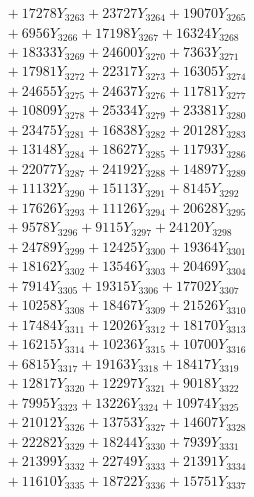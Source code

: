 \documentclass[a4paper,10pt]{article}
\begin{document}
{\begin{align}
&\;  + 17278 Y_{3263} + 23727 Y_{3264} + 19070 Y_{3265} \\[0.3ex]
&\;  + 6956 Y_{3266} + 17198 Y_{3267} + 16324 Y_{3268} \\[0.5ex]\allowbreak
&\;  + 18333 Y_{3269} + 24600 Y_{3270} + 7363 Y_{3271} \\[0.3ex]
&\;  + 17981 Y_{3272} + 22317 Y_{3273} + 16305 Y_{3274} \\[0.3ex]
&\;  + 24655 Y_{3275} + 24637 Y_{3276} + 11781 Y_{3277} \\[0.3ex]
&\;  + 10809 Y_{3278} + 25334 Y_{3279} + 23381 Y_{3280} \\[0.3ex]
&\;  + 23475 Y_{3281} + 16838 Y_{3282} + 20128 Y_{3283} \\[0.3ex]
&\;  + 13148 Y_{3284} + 18627 Y_{3285} + 11793 Y_{3286} \\[0.3ex]
&\;  + 22077 Y_{3287} + 24192 Y_{3288} + 14897 Y_{3289} \\[0.3ex]
&\;  + 11132 Y_{3290} + 15113 Y_{3291} + 8145 Y_{3292} \\[0.3ex]
&\;  + 17626 Y_{3293} + 11126 Y_{3294} + 20628 Y_{3295} \\[0.3ex]
&\;  + 9578 Y_{3296} + 9115 Y_{3297} + 24120 Y_{3298} \\[0.5ex]\allowbreak
&\;  + 24789 Y_{3299} + 12425 Y_{3300} + 19364 Y_{3301} \\[0.3ex]
&\;  + 18162 Y_{3302} + 13546 Y_{3303} + 20469 Y_{3304} \\[0.3ex]
&\;  + 7914 Y_{3305} + 19315 Y_{3306} + 17702 Y_{3307} \\[0.3ex]
&\;  + 10258 Y_{3308} + 18467 Y_{3309} + 21526 Y_{3310} \\[0.3ex]
&\;  + 17484 Y_{3311} + 12026 Y_{3312} + 18170 Y_{3313} \\[0.3ex]
&\;  + 16215 Y_{3314} + 10236 Y_{3315} + 10700 Y_{3316} \\[0.3ex]
&\;  + 6815 Y_{3317} + 19163 Y_{3318} + 18417 Y_{3319} \\[0.3ex]
&\;  + 12817 Y_{3320} + 12297 Y_{3321} + 9018 Y_{3322} \\[0.3ex]
&\;  + 7995 Y_{3323} + 13226 Y_{3324} + 10974 Y_{3325} \\[0.3ex]
&\;  + 21012 Y_{3326} + 13753 Y_{3327} + 14607 Y_{3328} \\[0.5ex]\allowbreak
&\;  + 22282 Y_{3329} + 18244 Y_{3330} + 7939 Y_{3331} \\[0.3ex]
&\;  + 21399 Y_{3332} + 22749 Y_{3333} + 21391 Y_{3334} \\[0.3ex]
&\;  + 11610 Y_{3335} + 18722 Y_{3336} + 15751 Y_{3337} \\[0.3ex]

\end{align}}
\end{document}
